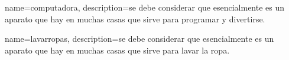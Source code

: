{
  name=computadora,
  description={se debe considerar que esencialmente es un aparato que hay en muchas casas que sirve para programar y divertirse.}
}

{
  name=lavarropas,
  description={se debe considerar que esencialmente es un aparato que hay en muchas casas que sirve para lavar la ropa.}
}
